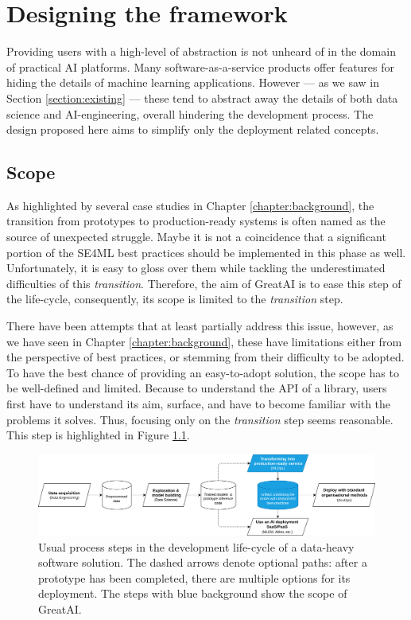 \chapter{Designing the framework} \label{chapter:design}

Providing users with a high-level of abstraction is not unheard of in the domain of practical AI platforms. Many software-as-a-service products offer features for hiding the details of machine learning applications. However --- as we saw in Section \ref{section:existing} --- these tend to abstract away the details of both data science and AI-engineering, overall hindering the development process. The design proposed here aims to simplify only the deployment related concepts.

\section{Scope} \label{section:scope}

As highlighted by several case studies in Chapter \ref{chapter:background}, the transition from prototypes to production-ready systems is often named as the source of unexpected struggle. Maybe it is not a coincidence that a significant portion of the SE4ML best practices should be implemented in this phase as well. Unfortunately, it is easy to gloss over them while tackling the underestimated difficulties of this \textit{transition}. Therefore, the aim of GreatAI is to ease this step of the life-cycle, consequently, its scope is limited to the \textit{transition} step.

There have been attempts that at least partially address this issue, however, as we have seen in Chapter \ref{chapter:background}, these have limitations either from the perspective of best practices, or stemming from their difficulty to be adopted. To have the best chance of providing an easy-to-adopt solution, the scope has to be well-defined and limited. Because to understand the API of a library, users first have to understand its aim, surface, and have to become familiar with the problems it solves. Thus, focusing only on the \textit{transition} step seems reasonable. This step is highlighted in Figure \ref{fig:scope}.

\begin{figure}
    \centering
    \includegraphics[width=\linewidth]{figures/scope.drawio.png}
    \caption{Usual process steps in the development life-cycle of a data-heavy software solution. The dashed arrows denote optional paths: after a prototype has been completed, there are multiple options for its deployment. The steps with blue background show the scope of GreatAI.}
    \label{fig:scope}
\end{figure}

